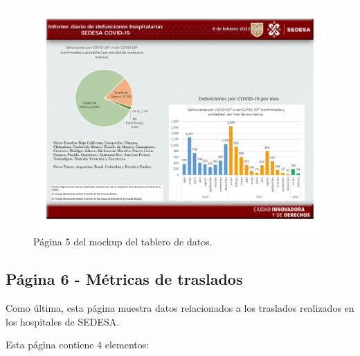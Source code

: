 \begin{figure}[H]
        \centering
        \includegraphics[width=\textwidth]{images/mockup_5.jpg}
        \caption{Página 5 del mockup del tablero de datos.} \label{fig:mock_pag5}
\end{figure}

\subsection{Página 6 - Métricas de traslados}

Como última, esta página muestra datos relacionados a los traslados realizados en los hospitales de SEDESA.

Esta página contiene 4 elementos:

